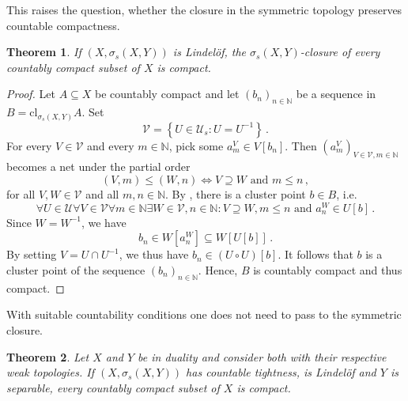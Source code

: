 \documentclass[
	paper=A4,
	pagesize=auto,
	fontsize=12pt
]{scrartcl}
\theoremstyle{plain}
\newtheorem{theorem}{Theorem}[section]
\theoremstyle{remark}
\theoremstyle{definition}
\begin{document}
%
This raises the question, whether the closure in the symmetric topology preserves countable compactness.
%
\begin{theorem}
\label{thm:LindelöfAndSymmetricClosureImpliesCompactness}
If $(X, \sigma_s(X, Y))$ is Lindelöf, the $\sigma_s(X, Y)$-closure of every countably compact subset of $X$ is compact.
\end{theorem}
\begin{proof}
Let $A \subseteq X$ be countably compact and let $(b_n)_{n \in \mathbb{N}}$ be a sequence in $B = \mathrm{cl}_{\sigma_s(X, Y)} A$.
Set
%
\begin{equation}
\mathcal{V} = \left\{ U \in \mathcal{U}_s : U = U^{-1} \right\} \, .
\end{equation}
%
For every $V \in \mathcal{V}$ and every $m \in \mathbb{N}$, pick some $a^V_m \in V[b_n]$.
Then $(a^V_m)_{V \in \mathcal{V}, m \in \mathbb{N}}$ becomes a net under the partial order
%
\begin{equation}
(V, m) \le (W, n)
\iff
V \supseteq W \text{ and } m \le n \, ,
\end{equation}
%
for all $V, W \in \mathcal{V}$ and all $m, n \in \mathbb{N}$.
By , there is a cluster point $b \in B$, i.e.
%
\begin{equation}
\forall U \in \mathcal{U} \forall V \in \mathcal{V} \forall m \in \mathbb{N} \exists W \in \mathcal{V}, n \in \mathbb{N} :
V \supseteq W, m \le n \text{ and } a^W_n \in U \left[ b \right] \, .
\end{equation}
%
Since $W = W^{-1}$, we have
%
\begin{equation}
b_n \in W \left[ a^W_n \right] \subseteq W \left[ U \left[ b \right] \right] \, .
\end{equation}
%
By setting $V = U \cap U^{-1}$, we thus have $b_n \in (U \circ U)[b]$.
It follows that $b$ is a cluster point of the sequence $(b_n)_{n \in \mathbb{N}}$.
Hence, $B$ is countably compact and thus compact.
\end{proof}
%
With suitable countability conditions one does not need to pass to the symmetric closure.
%
\begin{theorem}
Let $X$ and $Y$ be in duality and consider both with their respective weak topologies.
If $(X, \sigma_s(X, Y))$ has countable tightness, is Lindelöf and $Y$ is separable, every countably compact subset of $X$ is compact.
\end{theorem}
\end{document}
